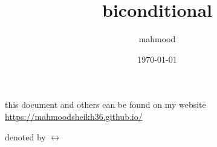 \documentclass[a4paper,12pt]{article}
\author{mahmood}
\date{\today}
\title{biconditional}
\begin{document}
\maketitle
\begin{note}
this document and others can be found on my website\\
\url{https://mahmoodsheikh36.github.io/}
\end{note}
denoted by \(\leftrightarrow\)
\end{document}
